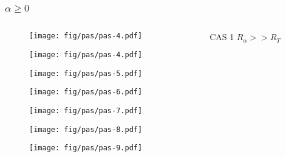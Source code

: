 \documentclass{beamer}
\begin{document}
\begin{frame}
\frametitle{$\alpha \geq 0$}
  \begin{columns}[t]
    \begin{column}{7cm}
      {
        \begin{figure}[h!]
          \centering
          \texttt{[image: fig/pas/pas-4.pdf]}
        \end{figure}
      }
      {
        \begin{figure}[h!]
          \centering
          \texttt{[image: fig/pas/pas-4.pdf]}
        \end{figure}
      }
      {
        \begin{figure}[h!]
          \centering
          \texttt{[image: fig/pas/pas-5.pdf]}
        \end{figure}
      }
      {
        \begin{figure}[h!]
          \centering
          \texttt{[image: fig/pas/pas-6.pdf]}
        \end{figure}
      }
      {
        \begin{figure}[h!]
          \centering
          \texttt{[image: fig/pas/pas-7.pdf]}
        \end{figure}
      }
      {
        \begin{figure}[h!]
          \centering
          \texttt{[image: fig/pas/pas-8.pdf]}
        \end{figure}
      }
      {
        \begin{figure}[h!]
          \centering
          \texttt{[image: fig/pas/pas-9.pdf]}
        \end{figure}
      }
    \end{column}
    \begin{column}{3cm}
      \begin{block}{}
        {
          \alert{CAS 1}
          \alert{$R_{\alpha} >> R_T$}\\

}
\end{block}
\end{column}
\end{columns}
\end{frame}
\end{document}
